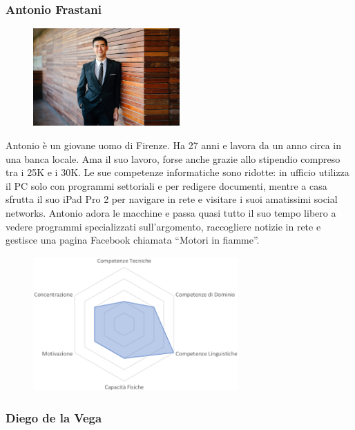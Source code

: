 \documentclass[12pt,italian,]{report}
\begin{document}
\newpage
\hypertarget{antonio-frastani-1}{%
\subsubsection{Antonio Frastani}\label{antonio-frastani-1}}

\begin{figure}[h]
\centering
\includegraphics[width=0.5\textwidth,height=\textheight]{img/antonio.jpeg}
\end{figure}

Antonio è un giovane uomo di Firenze. Ha 27 anni e lavora da un anno
circa in una banca locale. Ama il suo lavoro, forse anche grazie allo
stipendio compreso tra i 25K e i 30K. Le sue competenze informatiche
sono ridotte: in ufficio utilizza il PC solo con programmi settoriali e
per redigere documenti, mentre a casa sfrutta il suo iPad Pro 2 per
navigare in rete e visitare i suoi amatissimi social networks. Antonio
adora le macchine e passa quasi tutto il suo tempo libero a vedere
programmi specializzati sull'argomento, raccogliere notizie in rete e
gestisce una pagina Facebook chiamata ``Motori in fiamme''.

\begin{figure}[h]
\centering
\includegraphics[width=0.7\textwidth,height=\textheight]{img/antonio_competenze.png}
\end{figure}

\newpage
\hypertarget{diego-de-la-vega-1}{%
\subsubsection{Diego de la Vega}\label{diego-de-la-vega-1}}
\end{document}
